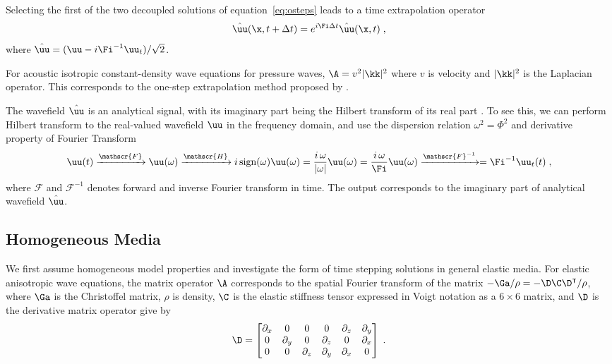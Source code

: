 Selecting the first of the two decoupled solutions of equation~\ref{eq:osteps} leads to a time extrapolation operator
\begin{equation}
\label{eq:os}
\hat{\uu}(\x,t+\Delta t) = e^{i\Fi\Delta t} \hat{\uu}(\x,t) \;,
\end{equation}
where $\hat{\uu} =(\uu-i\Fi^{-1}\uu_t)/\sqrt{2}$.

For acoustic isotropic constant-density wave equations for pressure waves, $\A = v^2|\kk|^2$ where $v$ is velocity and $|\kk|^2$ is the Laplacian operator.  This corresponds to the one-step extrapolation method proposed by \cite[]{zhang09}.

The wavefield $\hat{\uu}$ is an analytical signal, with its imaginary part being the Hilbert transform of its real part \cite[]{zhang09}. To see this, we can perform Hilbert transform to the real-valued wavefield $\uu$ in the frequency domain, and use the dispersion relation $\omega^2 = \Phi^2$ and derivative property of Fourier Transform
\newcommand{\sign}{\text{sign}}
\begin{equation}
    \label{eq:hilb}
    \uu(t) \xrightarrow{\mathscr{F}} \uu(\omega) \xrightarrow{\mathscr{H}} i\,\sign(\omega) \uu(\omega) = \frac{i\,\omega}{|\omega|} \uu(\omega) = \frac{i\,\omega}{\Fi} \uu(\omega) \xrightarrow{\mathscr{F}^{-1}} = \Fi^{-1}\uu_t(t) \;,
\end{equation}
where $\mathscr{F}$ and $\mathscr{F}^{-1}$ denotes forward and inverse Fourier transform in time. The output corresponds to the imaginary part of analytical wavefield $\hat{\uu}$.

\subsection{Homogeneous Media}
We first assume homogeneous model properties and investigate the form of time stepping solutions in general elastic media. For elastic anisotropic wave equations, the matrix operator $\A$ corresponds to the spatial Fourier transform of the matrix $-\Ga/\rho = -\D\C\D^\intercal/\rho$, where $\Ga$ is the Christoffel matrix, $\rho$ is density, $\C$ is the elastic stiffness tensor expressed in Voigt notation as a $6\times6$ matrix, and $\D$ is the derivative matrix operator give by
\begin{equation}
  \D=
  \begin{bmatrix}
    \partial_x & 0 & 0 & 0 & \partial_z & \partial_y \\
    0 & \partial_y & 0 & \partial_z & 0 & \partial_x \\
    0 & 0 & \partial_z & \partial_y & \partial_x & 0
  \end{bmatrix} \;.
\end{equation}


